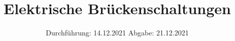 

\subject{V 302}
\title{Elektrische Brückenschaltungen}
\date{%
  Durchführung: 14.12.2021
  \hspace{3em}
  Abgabe: 21.12.2021
}



\maketitle
\thispagestyle{empty}
\tableofcontents
\newpage







\printbibliography{}


